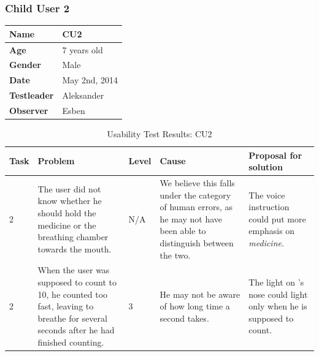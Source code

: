 \subsubsection{Child User 2}
\begin{table}[H]
\centering
\begin{tabular}{| p{4.0cm} | p{4.0cm} |}
\hline
 \textbf{Name} & CU2 \\
 \hline
 \textbf{Age} & 7 years old \\
 \hline 
 \textbf{Gender} & Male \\
 \hline
 \textbf{Date} & May 2nd, 2014 \\
 \hline
 \textbf{Testleader} & Aleksander \\
 \hline
 \textbf{Observer} & Esben \\
 \hline
\end{tabular}
\end{table}

\begin{table}[H]
\centering
\begin{tabular}{| p{1.0cm} | p{4.0cm} | p{0.9cm} | p{3.1cm} | p{3.7cm} |}
\hline
	\textbf{Task} & \textbf{Problem} & \textbf{Level} & \textbf{Cause} & \textbf{Proposal for solution} \\
	\hline
	2 & The user did not know whether he should hold the medicine or the breathing chamber towards the mouth. & N/A & We believe this falls under the category of human errors, as he may not have been able to distinguish between the two. & The voice instruction could put more emphasis on \emph{medicine}. \\
	\hline
	2 & When the user was supposed to count to 10, he counted too fast, leaving \ab{} to breathe for several seconds after he had finished counting. & 3 & He may not be aware of how long time a second takes. & The light on \ab{}'s nose could light only when he is supposed to count. \\
	\hline
\end{tabular}
\caption{Usability Test Results: CU2}
\label{tab:testchild2}
\end{table}

